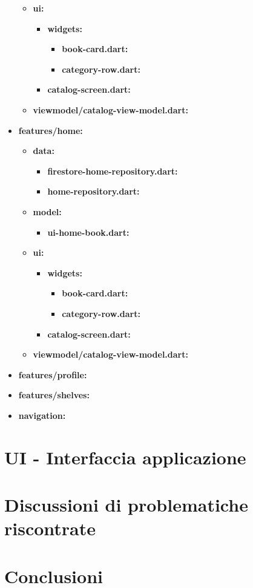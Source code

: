 \documentclass{article}
\begin{document}
\begin{itemize}
\begin{itemize}
\begin{itemize}
    \end{itemize}
    \item \textbf{ui:}
    \begin{itemize}
      \item \textbf{widgets:}
      \begin{itemize}
        \item \textbf{book-card.dart:}
        \item \textbf{category-row.dart:}
      \end{itemize}
      \item \textbf{catalog-screen.dart:}
    \end{itemize}
    \item \textbf{viewmodel/catalog-view-model.dart:}
  \end{itemize}
  \item \textbf{features/home:}
  \begin{itemize}
    \item \textbf{data:}
    \begin{itemize}
      \item \textbf{firestore-home-repository.dart:}
      \item \textbf{home-repository.dart:}
    \end{itemize}
    \item \textbf{model:}
    \begin{itemize}
      \item \textbf{ui-home-book.dart:}
    \end{itemize}
    \item \textbf{ui:}
    \begin{itemize}
      \item \textbf{widgets:}
      \begin{itemize}
        \item \textbf{book-card.dart:}
        \item \textbf{category-row.dart:}
      \end{itemize}
      \item \textbf{catalog-screen.dart:}
    \end{itemize}
    \item \textbf{viewmodel/catalog-view-model.dart:}
  \end{itemize}
  \item \textbf{features/profile:}
  \item \textbf{features/shelves:}
  \item \textbf{navigation:}
\end{itemize}

\section{UI - Interfaccia applicazione}

\section{Discussioni di problematiche riscontrate}

\section{Conclusioni}
\end{document}
